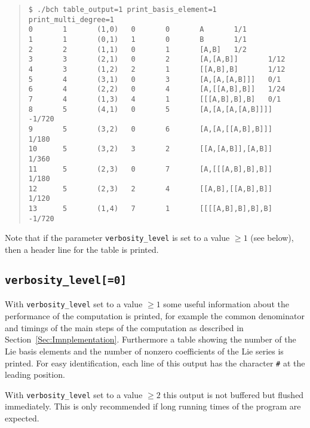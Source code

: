 \documentclass[11pt,a4paper]{article}
\begin{document}
\begin{quote} %
{\small\begin{BVerbatim}
$ ./bch table_output=1 print_basis_element=1 print_multi_degree=1
0       1       (1,0)   0       0       A       1/1
1       1       (0,1)   1       0       B       1/1
2       2       (1,1)   0       1       [A,B]   1/2
3       3       (2,1)   0       2       [A,[A,B]]       1/12
4       3       (1,2)   2       1       [[A,B],B]       1/12
5       4       (3,1)   0       3       [A,[A,[A,B]]]   0/1
6       4       (2,2)   0       4       [A,[[A,B],B]]   1/24
7       4       (1,3)   4       1       [[[A,B],B],B]   0/1     
8       5       (4,1)   0       5       [A,[A,[A,[A,B]]]]       -1/720
9       5       (3,2)   0       6       [A,[A,[[A,B],B]]]       1/180
10      5       (3,2)   3       2       [[A,[A,B]],[A,B]]       1/360
11      5       (2,3)   0       7       [A,[[[A,B],B],B]]       1/180
12      5       (2,3)   2       4       [[A,B],[[A,B],B]]       1/120
13      5       (1,4)   7       1       [[[[A,B],B],B],B]       -1/720
\end{BVerbatim}
}\end{quote}
Note that if the parameter  \verb|verbosity_level| 
is set to a value $\geq 1$ (see below), then  a header line for the table 
is printed.

\subsection*{\tt verbosity\_level[=0]}
With \verb|verbosity_level| set to a value $\geq 1$ some useful information about
the performance of the computation is printed, for example the common denominator 
and timings of the main steps of the computation as described in Section~\ref{Sec:Imnplementation}. Furthermore a table showing the number of the
Lie basis elements and the number of nonzero coefficients of the Lie series is printed.
For easy identification, each line of this output has the character \verb|#| at the leading position.

With \verb|verbosity_level| set to a value $\geq 2$ this  output is not buffered but flushed immediately. 
This is only recommended if long running times of the program are expected.
\end{document}

